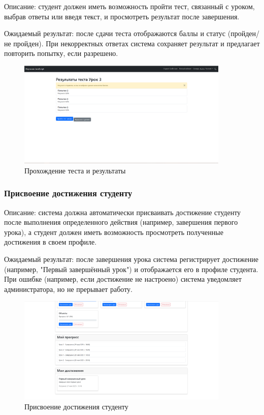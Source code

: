 Описание: студент должен иметь возможность пройти тест, связанный с уроком, выбрав ответы или введя текст, и просмотреть результат после завершения.
	
Ожидаемый результат: после сдачи теста отображаются баллы и статус (пройден/не пройден). При некорректных ответах система сохраняет результат и предлагает повторить попытку, если разрешено.
	
	\begin{figure}[ht]
		\centering
		\includegraphics[width=0.9\textwidth]{images/тестрез} 
		\caption{Прохождение теста и результаты}
		\label{test:image}
	\end{figure}
	
\subsubsection{Присвоение достижения студенту}
	
Описание: система должна автоматически присваивать достижение студенту после выполнения определенного действия (например, завершения первого урока), а студент должен иметь возможность просмотреть полученные достижения в своем профиле.
	
Ожидаемый результат: после завершения урока система регистрирует достижение (например, "Первый завершённый урок") и отображается его в профиле студента. При ошибке (например, если достижение не настроено) система уведомляет администратора, но не прерывает работу.
	
	\begin{figure}[ht]
		\centering
		\includegraphics[width=0.9\textwidth]{images/достижение} 
		\caption{Присвоение достижения студенту}
		\label{achiv:image}
	\end{figure}
	
